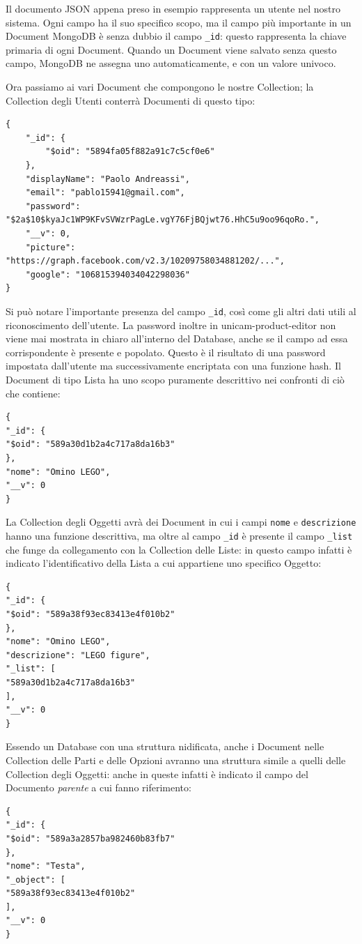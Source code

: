 Il documento JSON appena preso in esempio rappresenta un utente nel nostro sistema. Ogni campo ha il suo specifico scopo, ma il campo più importante in un Document MongoDB è senza dubbio il campo \texttt{\_id}: questo rappresenta la chiave primaria di ogni Document. Quando un Document viene salvato senza questo campo, MongoDB ne assegna uno automaticamente, e con un valore univoco.

Ora passiamo ai vari Document che compongono le nostre Collection; la Collection degli Utenti conterrà Documenti di questo tipo:
\begin{lstlisting}[caption={User Collection}, style=javaScriptCode]
{
	"_id": {
		"$oid": "5894fa05f882a91c7c5cf0e6"
	},
	"displayName": "Paolo Andreassi",
	"email": "pablo15941@gmail.com",
	"password": "$2a$10$kyaJc1WP9KFvSVWzrPagLe.vgY76FjBQjwt76.HhC5u9oo96qoRo.",
	"__v": 0,
	"picture": "https://graph.facebook.com/v2.3/10209758034881202/...",
	"google": "106815394034042298036"
}
\end{lstlisting}
Si può notare l'importante presenza del campo \texttt{\_id}, così come gli altri dati utili al riconoscimento dell'utente. La password inoltre in unicam-product-editor non viene mai mostrata in chiaro all'interno del Database, anche se il campo ad essa corrispondente è presente e popolato. Questo è il risultato di una password impostata dall'utente ma successivamente encriptata con una funzione hash.
\newpage
Il Document di tipo Lista ha uno scopo puramente descrittivo nei confronti di ciò che contiene:
\begin{lstlisting}[caption={List Collection}, style=javaScriptCode]
{
"_id": {
"$oid": "589a30d1b2a4c717a8da16b3"
},
"nome": "Omino LEGO",
"__v": 0
}
\end{lstlisting}

La Collection degli Oggetti avrà dei Document in cui i campi \texttt{nome} e \texttt{descrizione} hanno una funzione descrittiva, ma oltre al campo \texttt{\_id} è presente il campo \texttt{\_list} che funge da collegamento con la Collection delle Liste: in questo campo infatti è indicato l'identificativo della Lista a cui appartiene uno specifico Oggetto:
\begin{lstlisting}[caption={Object Collection}, style=javaScriptCode]
{
"_id": {
"$oid": "589a38f93ec83413e4f010b2"
},
"nome": "Omino LEGO",
"descrizione": "LEGO figure",
"_list": [
"589a30d1b2a4c717a8da16b3"
],
"__v": 0
}
\end{lstlisting}

Essendo un Database con una struttura nidificata, anche i Document nelle Collection delle Parti e delle Opzioni avranno una struttura simile a quelli delle Collection degli Oggetti: anche in queste infatti è indicato il campo del Documento \emph{parente} a cui fanno riferimento:
\begin{lstlisting}[caption={Part Collection}, style=javaScriptCode]
{
"_id": {
"$oid": "589a3a2857ba982460b83fb7"
},
"nome": "Testa",
"_object": [
"589a38f93ec83413e4f010b2"
],
"__v": 0
}
\end{lstlisting}

